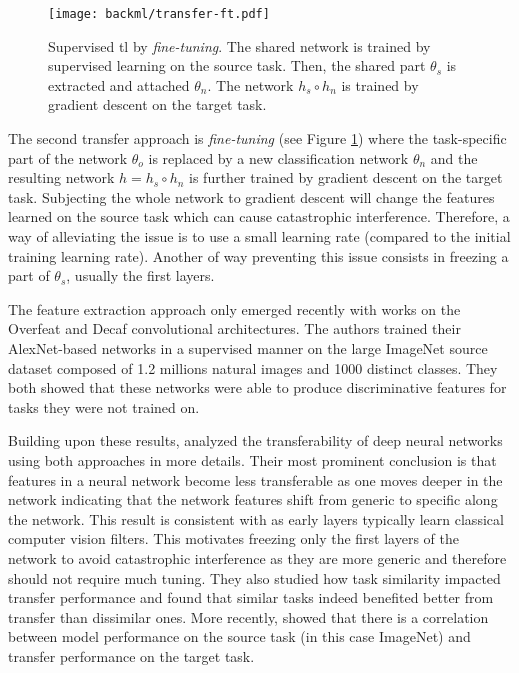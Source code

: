 \begin{figure}
  \centering
  \texttt{[image: backml/transfer-ft.pdf]}
  \caption{Supervised \acrlong{tl} by \textit{fine-tuning}. The shared network is trained by supervised learning on the source task. Then, the shared part $\theta_s$ is extracted and attached $\theta_n$. The network $h_s \circ h_n$ is trained by gradient descent on the target task.}
  \label{fig:backml:transfer-ft}
\end{figure}

The second transfer approach is \textit{fine-tuning} (see Figure \ref{fig:backml:transfer-ft})
where the task-specific part of the network $\theta_{o}$ is replaced by a new
classification network $\theta_{n}$ and the resulting network $h = h_s \circ h_n$
is further trained by gradient descent on the target task. Subjecting the whole
network to gradient descent will change the features learned on the source task
which can cause catastrophic interference. Therefore, a way of alleviating the
issue is to use a small learning rate (compared to the initial training learning
rate). Another of way preventing this issue consists in freezing a part of
$\theta_s$, usually the first layers.

The feature extraction approach only emerged recently with works on the Overfeat
\parencite{sermanet2013overfeat, razavian2014cnn} and Decaf \parencite{donahue2014decaf}
convolutional architectures. The authors trained their AlexNet-based networks in
a supervised manner on the large ImageNet source dataset composed of 1.2 millions
natural images and 1000 distinct classes. They both showed that these networks
were able to produce discriminative features for tasks they were not trained on.

Building upon these results, \parencite{yosinski2014transferable} analyzed the
transferability of deep neural networks using both approaches in more details.
Their most prominent conclusion is that features in a neural network become less
transferable as one moves deeper in the network indicating that the network features
shift from generic to specific along the network. This result is consistent with
\parencite{zeiler2014visualizing} as early layers typically learn classical computer
vision filters. This motivates freezing only the first layers of the network to
avoid catastrophic interference as they are more generic and therefore should not
require much tuning. They also studied how task similarity impacted transfer
performance and found that similar tasks indeed benefited better from transfer
than dissimilar ones. More recently, \parencite{kornblith2019better} showed that 
there is a correlation between model performance on the source task (in this case 
ImageNet) and transfer performance on the target task.

